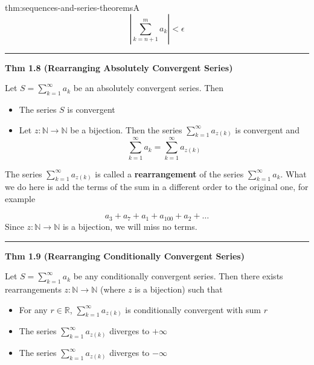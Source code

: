 \documentclass[landscape, 8pt]{extarticle}
\begin{document}
\begin{multicols}{3}
\begin{thm}{thm:sequences-and-series-theorems}{A}
	\vspace{-9pt}
	\[\left\lvert  \sum_{k=n+1}^{m} a_{k}  \right\rvert < \epsilon\]

	\noindent\rule{\textwidth}{0.2pt}

	\textbf{Thm 1.8 (Rearranging Absolutely Convergent Series)}

	Let $S=\sum_{k=1}^{\infty} a_{k}$ be an absolutely convergent series. Then

	\begin{itemize}
		\setlength\itemsep{0em}
		\item The series $S$ is convergent

		\item Let $z:\mathbb{N}\to \mathbb{N}$ be a bijection. Then the series $\sum_{k=1}^{\infty} a_{z(k)}$ is convergent and
			\vspace{-5pt}
			\[\sum_{k=1}^{\infty} a_{k} = \sum_{k=1}^{\infty} a_{z(k)} \]
	\end{itemize}

	\vspace{-5pt}
	The series $\sum_{k=1}^{\infty} a_{z(k)}$ is called a \textbf{rearrangement} of the series $\sum_{k=1}^{\infty} a_{k}$. What we do here is add the terms of the sum in a different order to the original one, for example

	\vspace{-8pt}
	\[a_{3} + a_{7}+ a_{1}+ a_{100} + a_{2} + \dots\]
	Since $z:\mathbb{N}\to \mathbb{N}$ is a bijection, we will miss no terms.

	\vspace{-5pt}
	\noindent\rule{\textwidth}{0.2pt}
	\textbf{Thm 1.9 (Rearranging Conditionally Convergent Series)}

	Let $S = \sum_{k=1}^{\infty} a_{k}$ be any conditionally convergent series. Then there exists rearrangements $z:\mathbb{N}\to \mathbb{N}$ (where $z$ is a bijection) such that

	\vspace{-5pt}
	\begin{itemize}[leftmargin=*]
		\setlength\itemsep{0em}
		\item For any $r\in\mathbb{R}$, $\sum_{k=1}^{\infty} a_{z(k)}$ is conditionally convergent with sum $r$

		\item The series $\sum_{k=1}^{\infty} a_{z(k)}$ diverges to $+\infty$

		\item The series $\sum_{k=1}^{\infty} a_{z(k)}$ diverges to $-\infty$


\end{itemize}
\end{thm}
\end{multicols}
\end{document}
